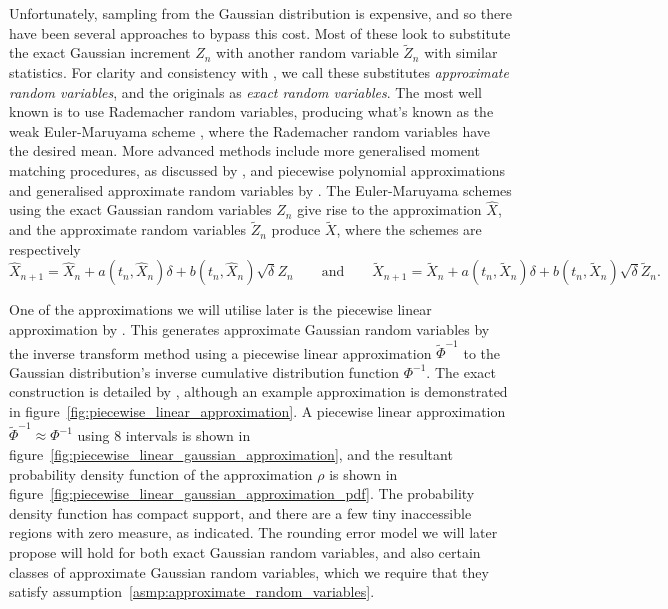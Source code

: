 \documentclass[9pt,a4paper,english]{extarticle}
\begin{document}
Unfortunately, sampling from the Gaussian distribution is expensive, and so there have been several approaches to bypass this cost. Most of these look to substitute the exact Gaussian increment $ Z_n $ with another random variable $ \widetilde{Z}_n $ with similar statistics. For clarity and consistency with \citeauthor{giles2020approximate} \citep{giles2020approximate,sheridan2020approximate_inverse,giles2020approximating}, we call these substitutes \emph{approximate random variables}, and the originals as \emph{exact random variables}. The most well known is to use Rademacher random variables, producing what's known as the weak Euler-Maruyama scheme \citep[page~XXXII]{kloeden1999numerical}, where the Rademacher random variables have the desired mean. More advanced methods include more generalised moment matching procedures, as discussed by \citet{muller1958inverse}, and piecewise polynomial approximations and generalised approximate random variables by \citeauthor{giles2020approximate} \citep{giles2020approximate,sheridan2020approximate_inverse}. The Euler-Maruyama schemes using the exact Gaussian random variables $ Z_n $ give rise to the approximation $ \widehat{X} $, and the approximate random variables $ \widetilde{Z}_n $ produce $ \widetilde{X} $, where the schemes are respectively 
\begin{equation*}
\widehat{X}_{n+1} = \widehat{X}_n + a(t_n, \widehat{X}_n) \delta + b(t_n, \widehat{X}_n)\sqrt{\delta} Z_n
\qquad \text{and} \qquad 
\widetilde{X}_{n+1} = \widetilde{X}_n + a(t_n, \widetilde{X}_n) \delta + b(t_n, \widetilde{X}_n)\sqrt{\delta} \widetilde{Z}_n.
\end{equation*}

One of the approximations we will utilise later is the piecewise linear approximation by \citet{giles2020approximating}. This generates approximate Gaussian random variables by the inverse transform method \citep{glasserman2013monte} using a piecewise linear approximation $ \widetilde{\Phi}^{-1} $ to the Gaussian distribution's inverse cumulative distribution function $ \Phi^{-1} $. The exact construction is detailed by \citet{giles2020approximating}, although an example approximation is demonstrated in figure~\ref{fig:piecewise_linear_approximation}. A piecewise linear approximation $ \widetilde{\Phi}^{-1} \approx \Phi^{-1} $ using 8 intervals is shown in figure~\ref{fig:piecewise_linear_gaussian_approximation}, and the resultant probability density function of the approximation $ \rho $ is shown in figure~\ref{fig:piecewise_linear_gaussian_approximation_pdf}. The probability density function has compact support, and there are a few tiny inaccessible regions with zero measure, as indicated. The rounding error model we will later propose will hold for both exact Gaussian random variables, and also certain classes of approximate Gaussian random variables, which we require that they satisfy assumption~\ref{asmp:approximate_random_variables}.
\end{document}
